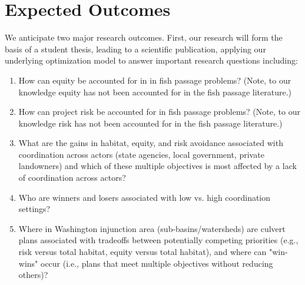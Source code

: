 \documentclass[12pt]{elsarticle}
\begin{document}



\section{Expected Outcomes} %

We anticipate two major research outcomes. First, our research will form the basis of a student thesis, leading to a scientific publication, applying our underlying optimization model to answer important research questions including:

\begin{enumerate}
\item How can equity be accounted for in in fish passage problems? (Note, to our knowledge equity has not been accounted for in the fish passage literature.)
\item How can project risk be accounted for in fish passage problems? (Note, to our knowledge risk has not been accounted for in the fish passage literature.)
\item What are the gains in habitat, equity, and risk avoidance associated with coordination across actors (state agencies, local government, private landowners) and which of these multiple objectives is most affected by a lack of coordination across actors?
\item Who are winners and losers associated with low vs. high coordination settings?
\item Where in Washington injunction area (sub-basins/watersheds) are culvert plans associated with tradeoffs between potentially competing priorities (e.g., risk versus total habitat, equity versus total habitat), and where can "win-wins" occur (i.e., plans that meet multiple objectives without reducing others)?
\end{enumerate}
\end{document}
